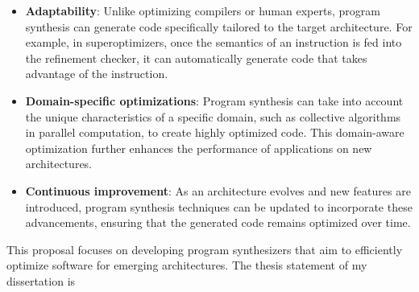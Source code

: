 \begin{itemize}
\item \textbf{Adaptability}: Unlike optimizing compilers or human experts,
program synthesis can generate code specifically tailored to the
target architecture.
For example, in superoptimizers,
once the semantics of an instruction is fed into the refinement checker,
it can automatically generate code that takes advantage of the instruction.

\item \textbf{Domain-specific optimizations}: Program synthesis can take
into account the unique characteristics of a specific domain,
such as collective algorithms in parallel computation,
to create highly optimized code.
This domain-aware optimization further enhances the
performance of applications on new architectures.

\item \textbf{Continuous improvement}: As an architecture evolves and
new features are introduced, program synthesis techniques can be updated
to incorporate these advancements, ensuring that the generated code remains
optimized over time.
\end{itemize}

This proposal focuses on developing program synthesizers
that aim to efficiently optimize software for emerging architectures.
The thesis statement of my dissertation is
